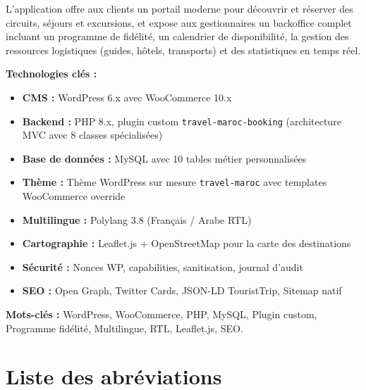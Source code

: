 \documentclass[12pt,a4paper]{report}
\begin{document}
L'application offre aux clients un portail moderne pour d\'ecouvrir et r\'eserver des
circuits, s\'ejours et excursions, et expose aux gestionnaires un backoffice complet
incluant un programme de fid\'elit\'e, un calendrier de disponibilit\'e, la gestion
des ressources logistiques (guides, h\^otels, transports) et des statistiques en
temps r\'eel.

\bigskip
\textbf{Technologies cl\'es :}
\begin{itemize}
  \item \textbf{CMS :} WordPress 6.x avec WooCommerce 10.x
  \item \textbf{Backend :} PHP 8.x, plugin custom \texttt{travel-maroc-booking}
        (architecture MVC avec 8 classes sp\'ecialis\'ees)
  \item \textbf{Base de donn\'ees :} MySQL avec 10 tables m\'etier personnalis\'ees
  \item \textbf{Th\`eme :} Th\`eme WordPress sur mesure \texttt{travel-maroc}
        avec templates WooCommerce override
  \item \textbf{Multilingue :} Polylang 3.8 (Fran\c{c}ais / Arabe RTL)
  \item \textbf{Cartographie :} Leaflet.js + OpenStreetMap pour la carte des destinations
  \item \textbf{S\'ecurit\'e :} Nonces WP, capabilities, sanitisation, journal d'audit
  \item \textbf{SEO :} Open Graph, Twitter Cards, JSON-LD TouristTrip, Sitemap natif
\end{itemize}

\bigskip
\textbf{Mots-cl\'es :}
WordPress, WooCommerce, PHP, MySQL, Plugin custom, Programme fid\'elit\'e,
Multilingue, RTL, Leaflet.js, SEO.

\clearpage

\chapter*{Liste des abr\'eviations}
\thispagestyle{fancy}
\end{document}
